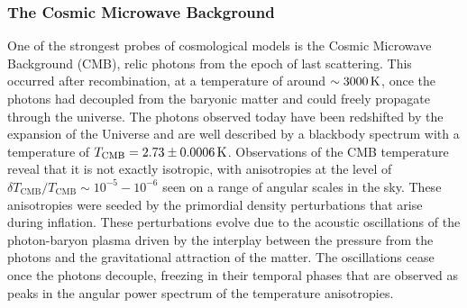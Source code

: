 \subsubsection*{The Cosmic Microwave Background}
One of the strongest probes of cosmological models is the Cosmic Microwave Background (CMB), relic photons from the epoch of last scattering. This occurred after recombination, at a temperature of around $\sim 3000 {\rm \,K}$, once the photons had decoupled from the baryonic matter and could freely propagate through the universe. The photons observed today have been redshifted by the expansion of the Universe and are well described by a blackbody spectrum with a temperature of $T_\mathrm{CMB} = 2.73\pm 0.0006{\rm \,K}$. Observations of the CMB temperature reveal that it is not exactly isotropic, with anisotropies at the level of $\delta T_\mathrm{CMB}/T_\mathrm{CMB}\sim 10^{-5} - 10^{-6} $ seen on a range of angular scales in the sky. These anisotropies were seeded by the primordial density perturbations that arise during inflation. These perturbations evolve due to the acoustic oscillations of the photon-baryon plasma driven by the interplay between the pressure from the photons and the gravitational attraction of the matter. The oscillations cease once the photons decouple, freezing in their temporal phases that are observed as peaks in the angular power spectrum of the temperature anisotropies. 

